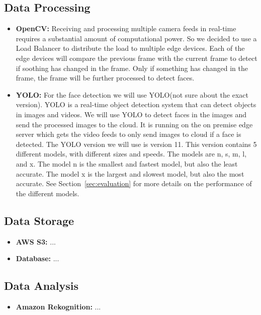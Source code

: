 \documentclass[conference]{IEEEtran}
\begin{document}
\subsection{Data Processing}
\begin{itemize}
    \item \textbf{OpenCV:} Receiving and processing multiple camera feeds in real-time requires a substantial amount of computational power.
          So we decided to use a Load Balancer to distribute the load to multiple edge devices.
          Each of the edge devices will compare the previous frame with the current frame to detect if soothing has changed in the frame.
          Only if something has changed in the frame, the frame will be further processed to detect faces.
    \item \textbf{YOLO:} For the face detection we will use YOLO(not sure about the exact version). YOLO is a real-time object detection system that can detect objects in images and videos.
          We will use YOLO to detect faces in the images and send the processed images to the cloud. It is running on the on premise edge server which gets the video feeds to only
          send images to cloud if a face is detected. 
          The YOLO version we will use is version 11. This version contains 5 different models, with different sizes and speeds. The models are n, s, m, l, and x. 
          The model n is the smallest and fastest model, but also the least accurate. The model x is the largest and slowest model, but also the most accurate.
          See Section~\ref{sec:evaluation} for more details on the performance of the different models.
\end{itemize}
\subsection{Data Storage}
\begin{itemize}
    \item \textbf{AWS S3:} ...
    \item \textbf{Database:} ...
\end{itemize}
\subsection{Data Analysis}
\begin{itemize}
    \item \textbf{Amazon Rekognition:} ...
\end{itemize}
\end{document}

